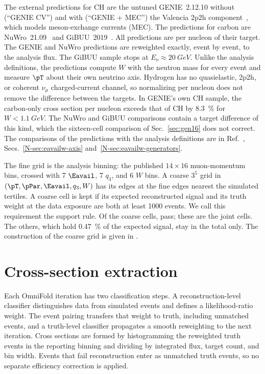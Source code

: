The external predictions for CH are the untuned GENIE~2.12.10 without (``GENIE CV'') and with (``GENIE + MEC'') the
Valencia 2p2h component~\cite{Nieves:2011pp}, which models meson-exchange currents (MEC).
The predictions for carbon are NuWro~21.09~\cite{Golan:2012wx} and GiBUU~2019~\cite{Buss:2011mx}.
All predictions are per nucleon of their target.
The GENIE and NuWro predictions are reweighted exactly, event by event, to the analysis flux.
The GiBUU sample stops at $E_{\nu}\approx\SI{20}{GeV}$.
Unlike the analysis definitions, the predictions compute $W$ with the neutron mass for every event and measure
$\pT$ about their own neutrino axis.
Hydrogen has no quasielastic, 2p2h, or coherent $\nu_{\mu}$ charged-current channel, so normalizing per nucleon
does not remove the difference between the targets.
In GENIE's own CH sample, the carbon-only cross section per nucleon exceeds that of CH by \SI{8.3}{\percent} for
$W<\SI{1.1}{GeV}$.
The NuWro and GiBUU comparisons contain a target difference of this kind, which the sixteen-cell comparison of
Sec.~\ref{sec:gen16} does not correct.
The comparisons of the predictions with the analysis definitions are in Ref.~\cite{AnalysisNote2026},
Secs.~\ref*{N-sec:eavailw-axis} and~\ref*{N-sec:eavailw-generators}.

The fine grid is the analysis binning: the published $14\times16$ muon-momentum bins, crossed with 7 $\Eavail$,
7 $q_{3}$, and 6 $W$ bins.
A coarse $3^{5}$ grid in $(\pT,\pPar,\Eavail,q_{3},W)$ has its edges at the fine edges nearest the simulated
tertiles.
A coarse cell is kept if its expected reconstructed signal and its truth weight at the data exposure are both at
least 1000 events.
We call this requirement the support rule.
Of the coarse cells, \jtNcells{} pass; these are the joint cells.
The others, which hold \SI{0.47}{\percent} of the expected signal, stay in the total only.
The construction of the coarse grid is given in .

\section{Cross-section extraction}
\label{sec:method}

Each OmniFold iteration has two classification steps.
A reconstruction-level classifier distinguishes data from simulated events and defines a likelihood-ratio weight.
The event pairing transfers that weight to truth, including unmatched events, and a truth-level classifier
propagates a smooth reweighting to the next iteration.
Cross sections are formed by histogramming the reweighted truth events in the reporting binning and dividing by
integrated flux, target count, and bin width.
Events that fail reconstruction enter as unmatched truth events, so no separate efficiency correction is applied.

